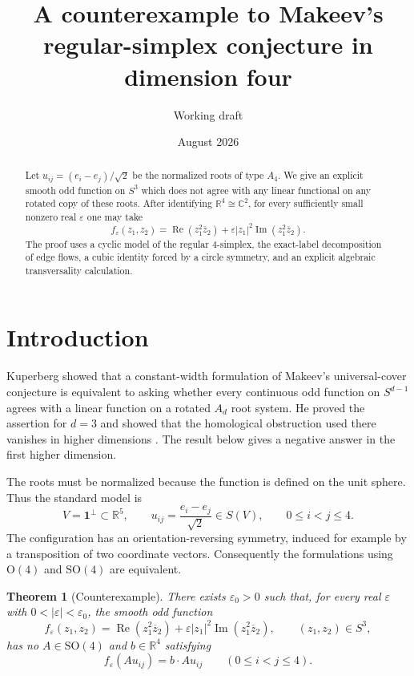 \documentclass[11pt,reqno]{amsart}
\title[Counterexample in dimension four]{A counterexample to Makeev's\\regular-simplex conjecture in dimension four}
\author{Working draft}
\date{August 2026}
\newtheorem{theorem}{Theorem}[section]
\theoremstyle{remark}
\newcommand{\R}{\mathbb R}
\newcommand{\C}{\mathbb C}
\newcommand{\one}{\mathbf 1}
\newcommand{\SO}{\mathrm{SO}}
\newcommand{\eps}{\varepsilon}
\newcommand{\abs}[1]{\left\lvert #1\right\rvert}
\begin{document}
\begin{abstract}
Let $u_{ij}=(e_i-e_j)/\sqrt2$ be the normalized roots of type $A_4$.
We give an explicit smooth odd function on $S^3$ which does not agree with
any linear functional on any rotated copy of these roots.  After identifying
$\R^4\cong\C^2$, for every sufficiently small nonzero real $\eps$ one may take
\[
 f_\eps(z_1,z_2)
 =\operatorname{Re}(z_1^2\overline z_2)
 +\eps\abs{z_1}^2\operatorname{Im}(z_1^2\overline z_2).
\]
The proof uses a cyclic model of the regular $4$-simplex, the exact-label
decomposition of edge flows, a cubic identity forced by a circle symmetry,
and an explicit algebraic transversality calculation.
\end{abstract}

\maketitle

\section{Introduction}

Kuperberg showed that a constant-width formulation of Makeev's universal-cover
conjecture is equivalent to asking whether every continuous odd function on
$S^{d-1}$ agrees with a linear function on a rotated $A_d$ root system.  He
proved the assertion for $d=3$ and showed that the homological obstruction used
there vanishes in higher dimensions \cite{Kuperberg1999}.  The result below gives a negative answer in the first higher
dimension.

The roots must be normalized because the function is defined on the unit
sphere.  Thus the standard model is
\[
 V=\one^\perp\subset\R^5,
 \qquad
 u_{ij}=\frac{e_i-e_j}{\sqrt2}\in S(V),
 \qquad 0\le i<j\le4.
\]
The configuration has an orientation-reversing symmetry, induced for example
by a transposition of two coordinate vectors.  Consequently the formulations
using $\mathrm O(4)$ and $\SO(4)$ are equivalent.

\begin{theorem}[Counterexample]\label{thm:counterexample}
There exists $\eps_0>0$ such that, for every real $\eps$ with
$0<\abs\eps<\eps_0$, the smooth odd function
\begin{equation}\label{eq:counterexample-function}
 f_\eps(z_1,z_2)
 =\operatorname{Re}(z_1^2\overline z_2)
 +\eps\abs{z_1}^2\operatorname{Im}(z_1^2\overline z_2),
 \qquad (z_1,z_2)\in S^3,
\end{equation}
has no $A\in\SO(4)$ and $b\in\R^4$ satisfying
\[
 f_\eps(Au_{ij})=b\cdot Au_{ij}
 \qquad(0\le i<j\le4).
\]
\end{theorem}
\end{document}
